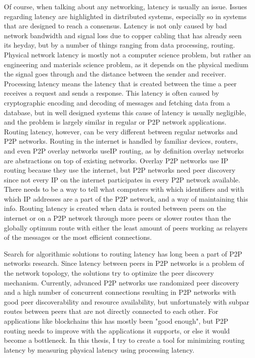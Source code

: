 Of course, when talking about any networking, latency is usually an issue. Issues regarding latency are highlighted in distributed systems, especially so in systems that are designed to reach a consensus. Latency is not only caused by bad network bandwidth and signal loss due to copper cabling that has already seen its heyday, but by a number of things ranging from data processing, routing. Physical network latency is mostly not a computer science problem, but rather an engineering and materials science problem, as it depends on the physical medium the signal goes through and the distance between the sender and receiver. Processing latency means the latency that is created between the time a peer receives a request and sends a response. This latency is often caused by cryptographic encoding and decoding of messages and fetching data from a database, but in well designed systems this cause of latency is usually negligible, and the problem is largely similar in regular or P2P network applications. Routing latency, however, can be very different between regular networks and P2P networks. Routing in the internet is handled by familiar devices, routers, and even P2P overlay networks useIP routing, as by definition overlay networks are abstractions on top of existing networks. Overlay P2P networks use IP routing because they use the internet, but P2P networks need peer discovery since not every IP on the internet participates in every P2P network available. There needs to be a way to tell what computers with which identifiers and with which IP addresses are a part of the P2P network, and a way of maintaining this info. Routing latency is created when data is routed between peers on the internet or on a P2P network through more peers or slower routes than the globally optimum route with either the least amount of peers working as relayers of the messages or the most efficient connections.

Search for algorithmic solutions to routing latency has long been a part of P2P networks research. Since latency between peers in P2P networks is a problem of the network topology, the solutions try to optimize the peer discovery mechanism. Currently, advanced P2P networks use randomized peer discovery and a high number of concurrent connections resulting in P2P networks with good peer discoverability and resource availability, but unfortunately with subpar routes between peers that are not directly connected to each other. For applications like blockchains this has mostly been "good enough", but P2P routing needs to improve with the applications it supports, or else it would become a bottleneck. In this thesis, I try to create a tool for minimizing routing latency by measuring physical latency using processing latency. 


